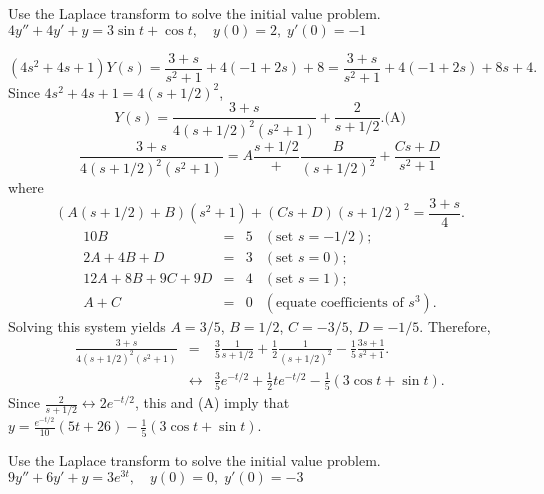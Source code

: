 \documentclass{ximera}
\begin{document}
\begin{problem}\label{exer:8.3.36} Use the Laplace transform to solve the initial value problem. $4y''+4y'+y=3\sin t+\cos t, \quad   y(0)=2,\;  y'(0)=-1$

\begin{solution}
$$
(4s^2+4s+1)Y(s)=\frac{3+s}{s^2+1}+4(-1+2s)+8=
\frac{3+s}{s^2+1}+4(-1+2s)+8s+4.
$$
Since $4s^2+4s+1=4(s+1/2)^2$,
$$
Y(s)=
\frac{3+s}{4(s+1/2)^2(s^2+1)}+\frac{2}{s+1/2}.
\text{(A)}
$$
$$
\frac{3+s}{4(s+1/2)^2(s^2+1)}={A}\frac{s+1/2}+\frac{B}{(s+1/2)^2}
+\frac{Cs+D}{s^2+1}
$$
where
$$
(A(s+1/2)+B)(s^2+1)+(Cs+D)(s+1/2)^2=\frac{3+s}{4}.
$$
$$
\begin{array}{rcrl}
10B&=&5&(\mbox{set }s=-1/2);\\
2A+4B+D&=&3& (\mbox{set }s=0);\\
12A+8B+9C+9D&=&4& (\mbox{set }s=1);\\
A+C&=&0&(\mbox{equate coefficients of }s^3).
\end{array}
$$
Solving this system yields $A=3/5$, $B=1/2$,
$C=-3/5$, $D=-1/5$. Therefore,
\begin{eqnarray*}
\frac{3+s}{4(s+1/2)^2(s^2+1)}
&=&
\frac{3}{5}\frac{1}{s+1/2}+\frac{1}{2}\frac{1}{(s+1/2)^2}
-\frac{1}{5}\frac{3s+1}{s^2+1}.
\\&\leftrightarrow&
\frac{3}{5}e^{-t/2}+\frac{1}{2}te^{-t/2}-\frac{1}{5}(3\cos t+\sin t).
\end{eqnarray*}
Since $\frac{2}{s+1/2}\leftrightarrow2e^{-t/2}$, this and (A)
imply that
 $y=\frac{e^{-t/2}}{10}(5t+26)-\frac{1}{5}(3\cos
t+\sin t)$.
\end{solution}
\end{problem}

\begin{problem}\label{exer:8.3.37} Use the Laplace transform to solve the initial value problem. $9y''+6y'+y=3e^{3t}, \quad   y(0)=0,\;  y'(0)=-3$
\end{problem}
\end{document}
